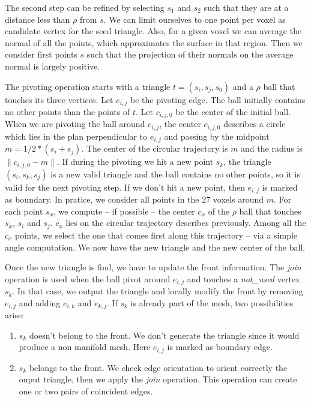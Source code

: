 \documentclass[12pt]{article}
\begin{document}
The second step can be refined by selecting $s_1$ and $s_2$ such that they are at a distance less than $\rho$ from $s$. We can limit ourselves to one point per voxel as candidate vertex for the seed triangle. Also, for a given voxel we can average the normal of all the points, which approximates the surface in that region. Then we consider first points $s$ such that the projection of their normals on the average normal is largely positive.

The pivoting operation starts with a triangle $t =(s_i, s_j, s_0)$ and a $\rho$ ball that touches its three vertices. Let $e_{i,j}$ be the pivoting edge. The ball initially contains no other points than the points of $t$. Let $c_{i,j,0}$ be the center of the initial ball. When we are pivoting the ball around $e_{i,j}$, the center $c_{i,j,0}$ describes a circle which lies in the plan perpendicular to $e_{i,j}$ and passing by the midpoint $m = 1/2 * (s_i + s_j)$. The center of the circular trajectory is $m$ and the radius is $\| c_{i,j,0} - m \|$. If during the pivoting we hit a new point $s_k$, the triangle $(s_i, s_k, s_j)$ is a new valid triangle and the ball contains no other points, so it is valid for the next pivoting step. If we don't hit a new point, then $e_{i,j}$ is marked as boundary.
In pratice, we consider all points in the 27 voxels around $m$. For each point $s_x$, we compute -- if possible -- the center $c_x$ of the $\rho$ ball that touches $s_x$, $s_i$ and $s_j$. $c_x$ lies on the circular trajectory describes previously. Among all the $c_x$ points, we select the one that comes first along this trajectory -- via a simple angle computation. We now have the new triangle and the new center of the ball.

Once the new triangle is find, we have to update the front information. The \textit{join} operation is used when the ball pivot around $e_{i,j}$ and touches a \textit{not\_used} vertex $s_k$. In that case, we output the triangle and locally modify the front by removing $e_{i,j}$ and adding $e_{i,k}$ and $e_{k,j}$. If $s_k$ is already part of the mesh, two possibilities arise:
\begin{enumerate}
\item $s_k$ doesn't belong to the front. We don't generate the triangle since it would produce a non manifold mesh. Here $e_{i,j}$ is marked as boundary edge.
\item $s_k$ belongs to the front. We check edge orientation to orient correctly the ouput triangle, then we apply the \textit{join} operation. This operation can create one or two pairs of coincident edges.
\end{enumerate}
\end{document}
